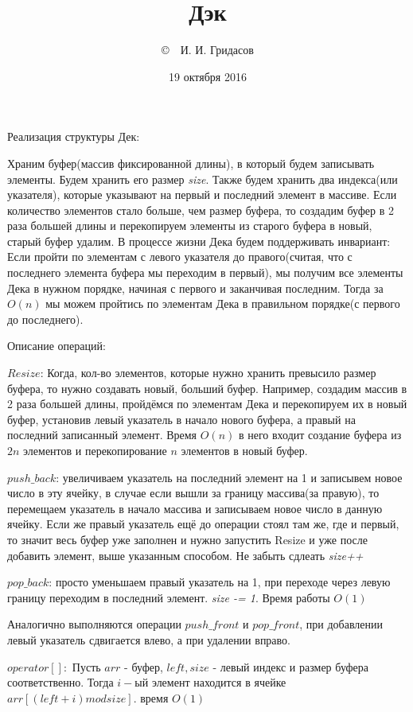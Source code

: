 \documentclass[12pt]{article}
\title{Дэк}
\date{19 октября 2016}
\author{\copyright~~И. И. Гридасов}
\begin{document}
\maketitle
Реализация структуры Дек:

Храним буфер(массив фиксированной длины), в который будем записывать элементы. Будем хранить его размер \textit{size}.
Также будем хранить два индекса(или указателя), которые указывают на первый и последний элемент в массиве.
Если количество элементов стало больше, чем размер буфера, то создадим буфер в 2 раза большей длины и перекопируем
элементы из старого буфера в новый, старый буфер удалим. 
В процессе жизни Дека будем поддерживать инвариант: Если пройти по элементам с левого указателя до правого(считая, что 
с последнего элемента буфера мы переходим в первый), мы получим все элементы Дека в нужном порядке, начиная с первого и
заканчивая последним. Тогда за $O(n)$ мы можем пройтись по элементам Дека в правильном порядке(с первого до последнего).

Описание операций:

$Resize$: Когда, кол-во элементов, которые нужно хранить превысило размер буфера, то нужно создавать новый, больший буфер.
Например, создадим массив в 2 раза большей длины, пройдёмся по элементам Дека и перекопируем их в новый буфер, установив
левый указатель в начало нового буфера, а правый на последний записанный элемент. Время $O(n)$ в него входит создание буфера
из $2n$ элементов и перекопирование $n$ элементов в новый буфер.

$push\_back$: увеличиваем указатель на последний элемент на 1 и записывем новое число в эту ячейку, 
в случае если вышли за границу массива(за правую), то перемещаем указатель в начало массива и записываем новое
число в данную ячейку. Если же правый указатель ещё до операции стоял там же, где и первый, то значит весь буфер
уже заполнен и нужно запустить Resize и уже после добавить элемент, выше указанным способом.
Не забыть сдлеать \textit{size++}

$pop\_back$: просто уменьшаем правый указатель на 1, при переходе через левую границу переходим в последний элемент.
\textit{size -= 1}. Время работы $O(1)$

Аналогично выполняются операции $push\_front$ и $pop\_front$, при добавлении левый указатель сдвигается влево, а при удалении вправо.

$operator[]:$ Пусть $arr$ - буфер, $left, size$ - левый индекс и размер буфера соответственно. Тогда $i-ый$ элемент находится в ячейке
$arr[(left + i) mod size]$. время $O(1)$
\end{document}
